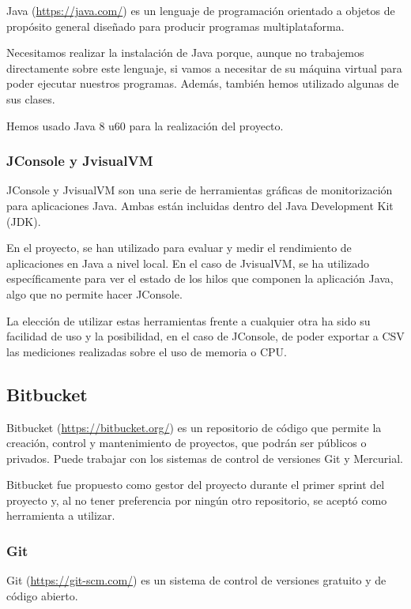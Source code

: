 Java (\url{https://java.com/}) es un lenguaje de programación orientado a objetos de propósito general diseñado para producir programas multiplataforma.

Necesitamos realizar la instalación de Java porque, aunque no trabajemos directamente sobre este lenguaje, si vamos a necesitar de su máquina virtual para poder ejecutar nuestros programas. Además, también hemos utilizado algunas de sus clases.

Hemos usado Java 8 u60 para la realización del proyecto.

\subsubsection{JConsole y JvisualVM}\label{DefJConsole}\label{DefJvisualVM}

JConsole y JvisualVM son una serie de herramientas gráficas de monitorización para aplicaciones Java. Ambas están incluidas dentro del Java Development Kit (JDK).

En el proyecto, se han utilizado para evaluar y medir el rendimiento de aplicaciones en Java a nivel local. En el caso de JvisualVM, se ha utilizado específicamente para ver el estado de los hilos que componen la aplicación Java, algo que no permite hacer JConsole.

La elección de utilizar estas herramientas frente a cualquier otra ha sido su facilidad de uso y la posibilidad, en el caso de JConsole, de poder exportar a CSV las mediciones realizadas sobre el uso de memoria o CPU.

\subsection{Bitbucket}\label{DefBitbucket}
Bitbucket (\url{https://bitbucket.org/}) es un repositorio de código que permite la creación, control y mantenimiento de proyectos, que podrán ser públicos o privados. Puede trabajar con los sistemas de control de versiones Git y Mercurial.

Bitbucket fue propuesto como gestor del proyecto durante el primer sprint del proyecto y, al no tener preferencia por ningún otro repositorio, se aceptó como herramienta a utilizar.

\subsubsection{Git}

Git (\url{https://git-scm.com/}) es un sistema de control de versiones gratuito y de código abierto.

